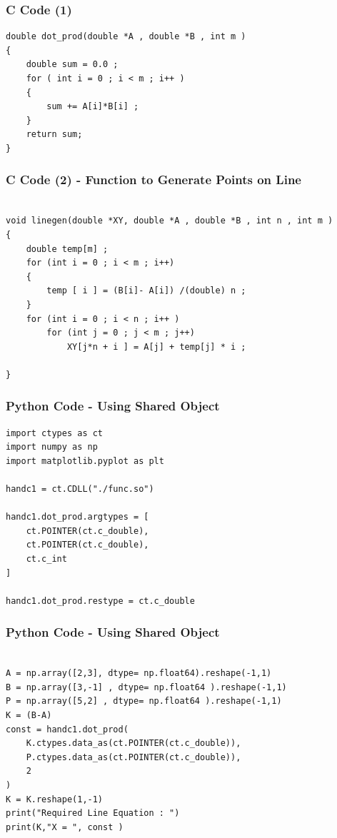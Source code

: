 \documentclass{beamer}
\begin{document}
\begin{frame}[fragile]
    \frametitle{C Code (1)}

    \begin{lstlisting}
double dot_prod(double *A , double *B , int m )
{
    double sum = 0.0 ; 
    for ( int i = 0 ; i < m ; i++ )
    {
        sum += A[i]*B[i] ;     
    }
    return sum; 
}
    \end{lstlisting}
\end{frame}

\begin{frame}[fragile]
    \frametitle{C Code (2) - Function to Generate Points on Line}
    \begin{lstlisting}
    
void linegen(double *XY, double *A , double *B , int n , int m )
{
    double temp[m] ; 
    for (int i = 0 ; i < m ; i++)
    {
        temp [ i ] = (B[i]- A[i]) /(double) n ; 
    }
    for (int i = 0 ; i < n ; i++ )
        for (int j = 0 ; j < m ; j++)
            XY[j*n + i ] = A[j] + temp[j] * i ; 
           
}

\end{lstlisting}
\end{frame}

\begin{frame}[fragile]
    \frametitle{Python Code - Using Shared Object}
    \begin{lstlisting}
import ctypes as ct
import numpy as np
import matplotlib.pyplot as plt

handc1 = ct.CDLL("./func.so")

handc1.dot_prod.argtypes = [
    ct.POINTER(ct.c_double),
    ct.POINTER(ct.c_double),
    ct.c_int
]

handc1.dot_prod.restype = ct.c_double

\end{lstlisting}
\end{frame}

\begin{frame}[fragile]
    \frametitle{Python Code - Using Shared Object}
    \begin{lstlisting}

A = np.array([2,3], dtype= np.float64).reshape(-1,1)
B = np.array([3,-1] , dtype= np.float64 ).reshape(-1,1)
P = np.array([5,2] , dtype= np.float64 ).reshape(-1,1)
K = (B-A) 
const = handc1.dot_prod(
    K.ctypes.data_as(ct.POINTER(ct.c_double)),
    P.ctypes.data_as(ct.POINTER(ct.c_double)),
    2
)
K = K.reshape(1,-1)
print("Required Line Equation : ")
print(K,"X = ", const )

\end{lstlisting}
\end{frame}
\end{document}
